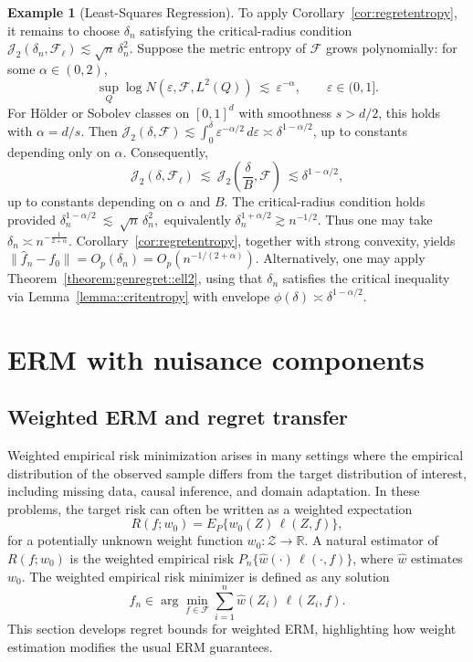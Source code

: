 \documentclass[11pt]{article}
\theoremstyle{plain}
\theoremstyle{definition} %
\newtheorem{example}{Example} %
\begin{document}
\begin{example}[Least-Squares Regression]
To apply Corollary~\ref{cor:regretentropy}, it remains to choose \(\delta_n\) satisfying the critical-radius condition
\(\mathcal J_2(\delta_n,\mathcal F_\ell)\lesssim \sqrt n\,\delta_n^2\). Suppose the metric entropy of \(\mathcal F\) grows polynomially:
for some \(\alpha\in(0,2)\),
\[
\sup_Q \log N\left(\varepsilon,\mathcal F,L^2(Q)\right)\ \lesssim\ \varepsilon^{-\alpha},
\qquad \varepsilon\in(0,1].
\]
For H\"older or Sobolev classes on \([0,1]^d\) with smoothness \(s>d/2\), this holds with \(\alpha=d/s\). Then
\(\mathcal J_2(\delta,\mathcal F)\lesssim \int_0^\delta \varepsilon^{-\alpha/2}\,d\varepsilon \asymp \delta^{1-\alpha/2}\),
up to constants depending only on \(\alpha\). Consequently,
\[
\mathcal J_2(\delta,\mathcal F_\ell)
\ \lesssim\
\mathcal J_2\left(\frac{\delta}{B},\mathcal F\right)
\ \lesssim \delta^{1-\alpha/2},
\]
up to constants depending on \(\alpha\) and \(B\). The critical-radius condition holds provided $\delta_n^{1-\alpha/2}\ \lesssim\ \sqrt n\,\delta_n^2,$
equivalently \(\delta_n^{1+\alpha/2}\gtrsim n^{-1/2}\). Thus one may take $\delta_n \asymp n^{-\frac{1}{2+\alpha}}.$
Corollary~\ref{cor:regretentropy}, together with strong convexity, yields
\(\|\hat f_n-f_0\| = O_p(\delta_n) = O_p(n^{-1/(2 + \alpha)})\).
Alternatively, one may apply Theorem~\ref{theorem:genregret::ell2}, using that \(\delta_n\) satisfies the critical inequality via Lemma~\ref{lemma::critentropy} with envelope \(\phi(\delta)\asymp \delta^{1-\alpha/2}\).

\end{example}
 

\section{ERM with nuisance components}
 \label{sec:nuis}
\subsection{Weighted ERM and regret transfer}

 \label{sec:weightedERM}

Weighted empirical risk minimization arises in many settings where the empirical distribution of the observed sample differs from the target distribution of interest, including missing data, causal inference, and domain adaptation. In these problems, the target risk can often be written as a weighted expectation
\[
R(f;w_0)=E_P\{w_0(Z)\,\ell(Z,f)\},
\]
for a potentially unknown weight function $w_0:\mathcal Z\to\mathbb R$. A natural estimator of $R(f;w_0)$ is the weighted empirical risk $P_n\{\hat w(\cdot)\,\ell(\cdot,f)\}$, where $\hat w$ estimates $w_0$.
The weighted empirical risk minimizer is defined as any solution
\[
\hat f_n \in \arg\min_{f \in \mathcal{F}} \sum_{i=1}^n \hat{w}(Z_i)\,\ell(Z_i,f).
\]
This section develops regret bounds for weighted ERM, highlighting how weight estimation modifies the usual ERM guarantees.
\end{document}
